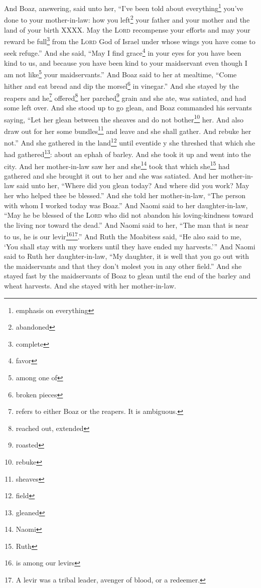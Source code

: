 

\begin{enumerate*}[mode=unboxed]
     And Boaz, answering, said unto her, ``I've been told about everything\footnote{emphasis on everything} you've done to your mother-in-law: how you left\footnote{abandoned} your father and your mother and the land of your birth XXXX.%
     May the \textsc{Lord} recompense your efforts and may your reward be full\footnote{complete} from the \textsc{Lord} God of Israel under whose wings you have come to seek refuge.''%
     And she said, ``May I find grace\footnote{favor} in your eyes for you have been kind to us, and because you have been kind to your maidservant even though I am not like\footnote{among one of} your maidservants.''%
     And Boaz said to her at mealtime, ``Come hither and eat bread and dip the morsel\footnote{broken pieces} in vinegar.'' And she stayed by the reapers and he\footnote{refers to either Boaz or the reapers. It is ambiguous.} offered\footnote{reached out, extended} her parched\footnote{roasted} grain and she ate, was satiated, and had some left over.%
     And she stood up to go glean, and Boaz commanded his servants saying, ``Let her glean between the sheaves and do not bother\footnote{rebuke} her.%
     And also draw out for her some bundles\footnote{sheaves} and leave and she shall gather. And rebuke her not.''%
     And she gathered in the land\footnote{field} until eventide y she threshed that which she had gathered\footnote{gleaned}: about an ephah of barley.%
     And she took it up and went into the city. And her mother-in-law saw her and she\footnote{Naomi} took that which she\footnote{Ruth} had gathered and she brought it out to her and she was satiated.%
     And her mother-in-law said unto her, ``Where did you glean today? And where did you work? May her who helped thee be blessed.'' And she told her mother-in-law, ``The person with whom I worked today was Boaz.''%
     And Naomi said to her daughter-in-law, ``May he be blessed of the \textsc{Lord} who did not abandon his loving-kindness toward the living nor toward the dead.'' And Naomi said to her, ``The man that is near to us, he is our levir\footnote{is among our levirs}\footnote{A levir was a tribal leader, avenger of blood, or a redeemer.}.''%
     And Ruth the Moabitess said, ``He also said to me, `You shall stay with my workers until they have ended my harvests.'''%
     And Naomi said to Ruth her daughter-in-law, ``My daughter, it is well that you go out with the maidservants and that they don't molest you in any other field.''%
     And she stayed fast by the maidservants of Boaz to glean until the end of the barley and wheat harvests. And she stayed with her mother-in-law.%
\end{enumerate*}
